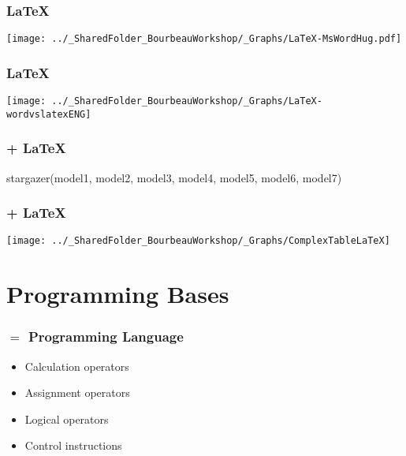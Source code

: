 \documentclass{beamer}
\begin{document}
    \begin{frame}
        \frametitle{\LaTeX} \vspace{1cm}   
        \begin{center}
           \texttt{[image: ../\_SharedFolder\_BourbeauWorkshop/\_Graphs/LaTeX-MsWordHug.pdf]}
        \end{center}  
    \end{frame}

    \begin{frame}
        \frametitle{\LaTeX} \vspace{1cm}
        \begin{center}
           \texttt{[image: ../\_SharedFolder\_BourbeauWorkshop/\_Graphs/LaTeX-wordvslatexENG]}
        \end{center} 
    \end{frame}
 
    \begin{frame}[fragile=singleslide]
        \frametitle{\R + \LaTeX} \vspace{0.5cm} 
        \begin{code}
stargazer(model1, model2, model3, model4, model5, model6, model7)
        \end{code}
    \end{frame}   

    \begin{frame}
        \frametitle{\R + \LaTeX} \vspace{1cm}   
        \begin{center}
           \texttt{[image: ../\_SharedFolder\_BourbeauWorkshop/\_Graphs/ComplexTableLaTeX]}
        \end{center}  
    \end{frame}















\section{\R {} Programming Bases}

    \begin{frame}
        \frametitle{\R $=$ Programming Language}
        \begin{itemize}
            \item Calculation operators
            \item Assignment operators
            \item Logical operators
            \item Control instructions
        \end{itemize}
    \end{frame}
\end{document}
